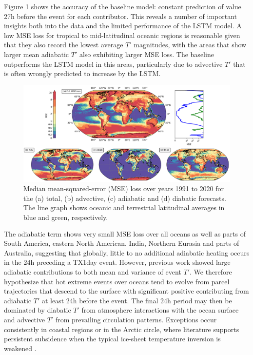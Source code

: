 \documentclass[11pt,a4paper,twoside,openright]{report}
\theoremstyle{definition}
\begin{document}
Figure \ref{fig:msebase} shows the accuracy of the baseline model: constant prediction of value 27h before the event for each contributor. This reveals a number of important insights both into the data and the limited performance of the LSTM model. A low MSE loss for tropical to mid-latitudinal oceanic regions is reasonable given that they also record the lowest average \(T'\) magnitudes, with the areas that show larger mean adiabatic \(T'\) also exhibiting larger MSE loss. The baseline outperforms the LSTM model in this areas, particularly due to advective \(T'\) that is often wrongly predicted to increase by the LSTM.

\begin{figure}[h]
\includegraphics[width=1\linewidth]{images/mse_base} \caption{Median mean-squared-error (MSE) loss over years 1991 to 2020 for the (a) total, (b) advective, (c) adiabatic and (d) diabatic forecasts. The line graph shows oceanic and terrestrial latitudinal averages in blue and green, respectively.}\label{fig:msebase}
\end{figure}

The adiabatic term shows very small MSE loss over all oceans as well as parts of South America, eastern North American, India, Northern Eurasia and parts of Australia, suggesting that globally, little to no additional adiabatic heating occurs in the 24h preceding a TX1day event. However, previous work showed large adiabatic contributions to both mean and variance of event \(T'\). We therefore hypothesize that hot extreme events over oceans tend to evolve from parcel trajectories that descend to the surface with significant positive contributing from adiabatic \(T'\) at least 24h before the event. The final 24h period may then be dominated by diabatic \(T'\) from atmosphere interactions with the ocean surface and advective \(T'\) from prevailing circulation patterns. Exceptions occur consistently in coastal regions or in the Arctic circle, where literature supports persistent subsidence when the typical ice-sheet temperature inversion is weakened \citep{wille_extraordinary_2024}.
\end{document}
